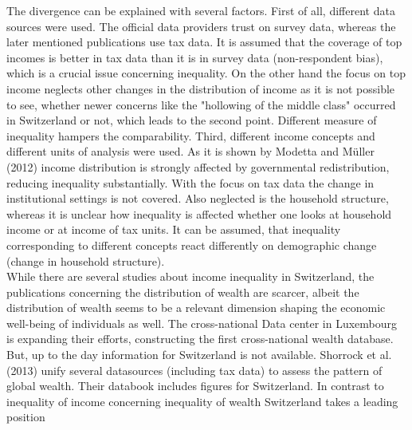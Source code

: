 \documentclass[twoside]{article}\usepackage[]{graphicx}\usepackage[]{color}
\begin{document}
\begin{multicols}{2}

The divergence can be explained with several factors. First of all, different data sources were used. The official data providers trust on survey data, whereas the later mentioned publications use tax data. It is assumed that the coverage of top incomes is better in tax data than it is in survey data (non-respondent bias), which is a crucial issue concerning inequality. On the other hand the focus on top income neglects other changes in the distribution of income as it is not possible to see, whether newer concerns like the "hollowing of the middle class" occurred in Switzerland or not, which leads to the second point. Different measure of inequality hampers the comparability. Third, different income concepts and different units of analysis were used. As it is shown by Modetta and Müller (2012) income distribution is strongly affected by governmental redistribution, reducing inequality substantially. With the focus on tax data the change in institutional settings is not covered. Also neglected is the household structure, whereas it is unclear how inequality is affected whether one looks at household income or at income of tax units. It can be assumed, that inequality corresponding to different concepts react differently on demographic change (change in household structure). \\


While there are several studies about income inequality in Switzerland, the publications concerning the distribution of wealth are scarcer, albeit the distribution of wealth seems to be a relevant dimension shaping the economic well-being of individuals as well. The cross-national Data center in Luxembourg is expanding their efforts, constructing the first cross-national wealth database. But, up to the day information for Switzerland is not available. 
Shorrock et al. (2013) unify several datasources (including tax data) to assess the pattern of global wealth. Their databook includes figures for Switzerland. In contrast to inequality of income concerning inequality of wealth Switzerland takes a leading position \\


\end{multicols}
\end{document}
